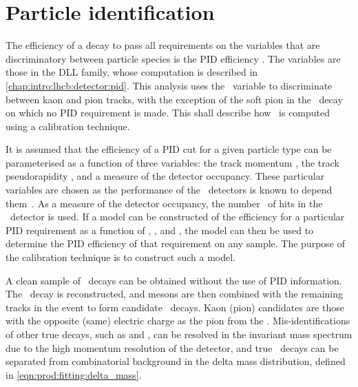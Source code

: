 \section{Particle identification}
\label{chap:prod:effs:pid}

The efficiency of a decay to pass all requirements on the variables that are 
discriminatory between particle species is the \ac{PID} efficiency \effpid.
The variables are those in the \acf{DLL} family, whose computation is described 
in \cref{chap:intro:lhcb:detector:pid}.
This analysis uses the \dllkpi\ variable to discriminate between kaon and pion 
tracks, with the exception of the soft pion in the \DstToDzpi\ decay on which 
no \ac{PID} requirement is made.
This  shall describe how \effpid\ is computed 
using a calibration technique.

It is assumed that the efficiency of a \ac{PID} cut for a given particle type 
can be parameterised as a function of three variables: the track momentum 
\ptot, the track pseudorapidity \Eta, and a measure of the detector occupancy.
These particular variables are chosen as the performance of the \rich\ 
detectors is known to depend them~\cite{Adinolfi:2012qfa}.
As a measure of the detector occupancy, the number \nspd\ of hits in the \spd\ 
detector is used.
If a model can be constructed of the efficiency for a particular \ac{PID} 
requirement as a function of \ptot, \Eta, and \nspd, the model can then be used 
to determine the \ac{PID} efficiency of that requirement on any sample.
The purpose of the calibration technique is to construct such a model.

A clean sample of \DzToKpi\ decays can be obtained without the use of \ac{PID} 
information.
The \DzToKpi\ decay is reconstructed, and \PDzero mesons are then combined with 
the remaining tracks in the event to form candidate \DstToDzpi\ decays.
Kaon (pion) candidates are those with the opposite (same) electric charge as 
the pion from the \PDstarp.
Mis-identifications of other true \PDzero decays, such as 
\decay{\PDzero}{\Ppiplus\Ppiminus} and \decay{\PDzero}{\PKplus\PKminus}, can be 
resolved in the \PDzero invariant mass spectrum due to the high momentum 
resolution of the detector, and true \PDstarp\ decays can be separated from 
combinatorial background in the delta mass distribution, defined in 
\cref{eqn:prod:fitting:delta_mass}.

